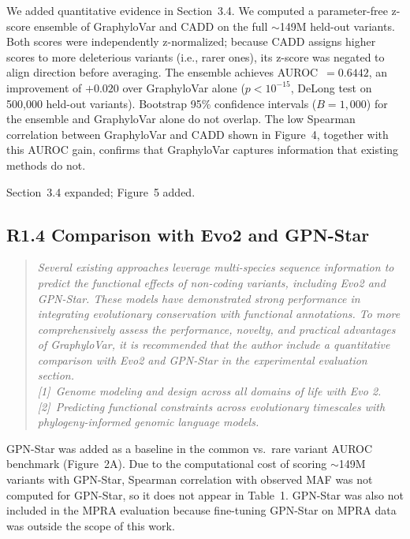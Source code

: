 \documentclass[11pt]{article}
\begin{document}
We added quantitative evidence in Section~3.4.  We computed a
parameter-free z-score ensemble of GraphyloVar and CADD on the full
$\sim$149M held-out variants.  Both scores were independently z-normalized;
because CADD assigns higher scores to more deleterious variants (i.e.,
rarer ones), its z-score was negated to align direction before averaging.
The ensemble achieves AUROC~$= 0.6442$, an improvement of $+0.020$ over
GraphyloVar alone ($p < 10^{-15}$, DeLong test on 500,000 held-out
variants).  Bootstrap 95\% confidence intervals ($B = 1{,}000$) for the
ensemble and GraphyloVar alone do not overlap.  The low Spearman correlation
between GraphyloVar and CADD shown in Figure~4, together with this AUROC
gain, confirms that GraphyloVar captures information that existing methods
do not.

Section~3.4 expanded; Figure~5 added.

\bigskip

\subsection*{R1.4 Comparison with Evo2 and GPN-Star}

\begin{quote}
\itshape
Several existing approaches leverage multi-species sequence information
to predict the functional effects of non-coding variants, including Evo2
and GPN-Star.  These models have demonstrated strong performance in
integrating evolutionary conservation with functional annotations.  To
more comprehensively assess the performance, novelty, and practical
advantages of GraphyloVar, it is recommended that the author include a
quantitative comparison with Evo2 and GPN-Star in the experimental
evaluation section.\\
{[1]}~Genome modeling and design across all domains of life with Evo 2.\\
{[2]}~Predicting functional constraints across evolutionary timescales
with phylogeny-informed genomic language models.
\end{quote}

GPN-Star was added as a baseline in the common vs.\ rare variant AUROC
benchmark (Figure~2A).  Due to the computational cost of scoring
$\sim$149M variants with GPN-Star, Spearman correlation with observed MAF
was not computed for GPN-Star, so it does not appear in Table~1.  GPN-Star
was also not included in the MPRA evaluation because fine-tuning GPN-Star
on MPRA data was outside the scope of this work.
\end{document}

